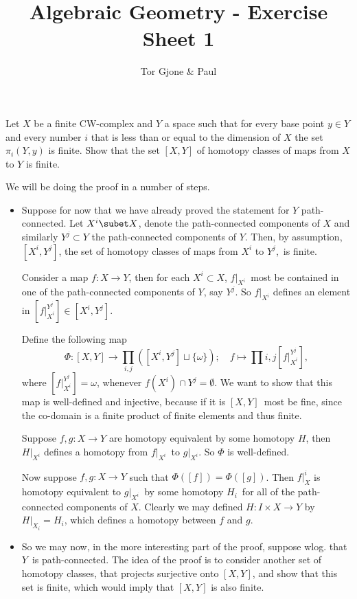 \documentclass[a4paper,11pt,english]{article}
\title{\textbf{Algebraic Geometry} - Exercise Sheet 1}
\author{Tor Gjone \& Paul}
\begin{document}
\mmaketitle

\begin{exercise}[1]
Let $X$ be a finite CW-complex and $Y$ a space such that for every base point
$y \in Y$ and every number $i$ that is less than or equal to the dimension of
$X$ the set $\pi_i(Y, y)$ is finite. Show that the set $[X, Y]$ of homotopy
classes of maps from $X$ to $Y$ is finite.
\end{exercise} 

\begin{solution}[1] %
We will be doing the proof in a number of steps.
\begin{itemize}
\item Suppose for now that we have already proved the statement for $Y$
path-connected. Let $X^i \subet X$,  denote the path-connected components of $X$ and
similarly $Y^j \subset Y$ the path-connected components of $Y$. Then, by
assumption, $[X^i,Y^j]$, the set of homotopy classes of maps from $X^i$ to
$Y^j$, is finite.

Consider a map $f: X \to Y$, then for each $X^i\subset X$, $f|_{X^i}$ most be
contained in one of the path-connected components of $Y$, say $Y^j$. So
$f|_{X^i}$ defines an element in $[f|_{X^i}^{Y^j}] \in [X^i, Y^j]$. 

Define the following map
\[ \Phi : [X, Y] \to \prod_{i, j} \left( [X^i, Y^j] \sqcup \{ \omega \} \right);
\quad  
f \mapsto \prod{i,j} [f|_{X^i}^{Y^j}], \]
where $[f|_{X^i}^{Y^j}] = \omega$, whenever $f(X^i) \cap Y^j = \emptyset$. We
want to show that this map is well-defined and injective, because if it is $[X,
Y]$ most be fine, since the co-domain is a finite product of finite elements and
thus finite.

Suppose $f, g: X \to Y$ are homotopy equivalent by some homotopy $H$, then
$H|_{X^i}$ defines a homotopy from $f|_{X^i}$ to $g|_{X^i}$. So $\Phi$ is
well-defined. 

Now suppose $f,g: X \to Y$ such that $\Phi([f]) = \Phi([g])$. Then $f|_X^i$ is
homotopy equivalent to $g|_{X^i}$ by some homotopy $H_i$ for all of the
path-connected components of $X$. Clearly we may defined $H: I\times X \to Y$
by $H|_{X_i} = H_i$, which defines a homotopy between $f$ and $g$.

\item
So we may now, in the more interesting part of the proof, suppose wlog. that
$Y$ is path-connected. The idea of the proof is to consider another set of
homotopy classes, that projects surjective onto $[X,Y]$, and show that this set
is finite, which would imply that $[X,Y]$ is also finite.


\end{itemize}
\end{solution}
\end{document}
